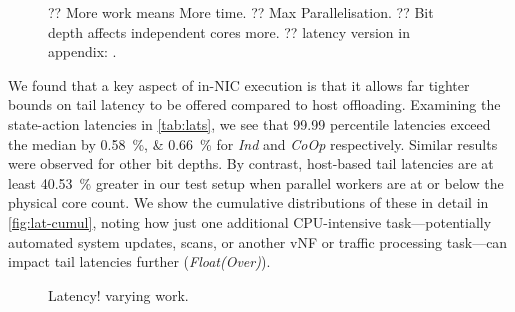 \documentclass[sigconf,natbib=false]{acmart}
\newcommand{\Coopfw}{\emph{CoOp}}
\newcommand{\Indfw}{\emph{Ind}}
\begin{document}
\begin{figure}
	\caption{?? More work means More time. ?? Max Parallelisation. ?? Bit depth affects independent cores more. ?? latency version in appendix: .\label{fig:vary-work}}
\end{figure}

We found that a key aspect of in-NIC execution is that it allows far tighter bounds on tail latency to be offered compared to host offloading.
Examining the state-action latencies in \cref{tab:lats}, we see that \num{99.99} percentile latencies exceed the median by \SIlist{0.58;0.66}{\percent} for \Indfw{} and \Coopfw{} respectively.
Similar results were observed for other bit depths.
By contrast, host-based tail latencies are at least \SI{40.53}{\percent} greater in our test setup when parallel workers are at or below the physical core count.
We show the cumulative distributions of these in detail in \cref{fig:lat-cumul}, noting how just one additional CPU-intensive task---potentially automated system updates, scans, or another vNF or traffic processing task---can impact tail latencies further (\emph{Float(Over)}).

\begin{figure}
	\caption{Latency! varying work.\label{fig:vary-work-latency}}
\end{figure}
\end{document}
